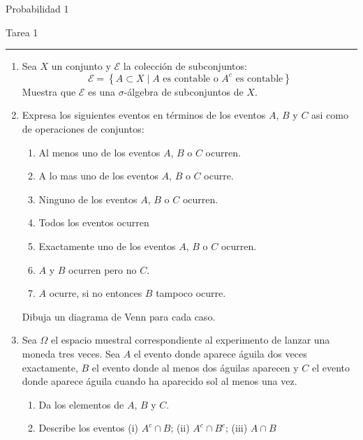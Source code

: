 \documentclass[12pt]{extreport}
\begin{document}
\begin{center}
    \textsf{\Large Probabilidad 1}
    \par\medskip
    \textsf{\large Tarea 1}
\end{center}
\hrule
\par\bigskip

\begin{enumerate}
    \item Sea $X$ un conjunto y $\mathcal{E}$ la colección de subconjuntos:
          $$
              \mathcal{E} = \left\{A\subset X \mid A \text{ es contable o } A^c \text{ es contable}  \right\}
          $$
          Muestra que $\mathcal{E}$ es una $\sigma$-álgebra de subconjuntos de $X$.
    \item Expresa los siguientes eventos en términos de los eventos $A$, $B$ y $C$ asi como de operaciones de conjuntos:
          \begin{enumerate}
              \item Al menos uno de los eventos $A$, $B$ o $C$ ocurren.
              \item A lo mas uno de los eventos $A$, $B$ o $C$ ocurre.
              \item Ninguno de los eventos $A$, $B$ o $C$ ocurren.
              \item Todos los eventos ocurren
              \item Exactamente uno de los eventos $A$, $B$ o $C$ ocurren.
              \item $A$ y $B$ ocurren pero no $C$.
              \item $A$ ocurre, si no entonces $B$ tampoco ocurre.
          \end{enumerate}
          Dibuja un diagrama de Venn para cada caso.
    \item Sea $\Omega$ el espacio muestral correspondiente al experimento de lanzar una moneda tres veces. Sea $A$ el evento donde aparece águila dos veces exactamente, $B$ el evento donde al menos dos águilas aparecen y $C$ el evento donde aparece águila cuando ha aparecido sol al menos una vez.
          \begin{enumerate}
              \item Da los elementos de $A$, $B$ y $C$.
              \item Describe los eventos (i) $A^c\cap B$; (ii) $A^c\cap B^c$; (iii) $A\cap B$
          \end{enumerate}

\end{enumerate}
\end{document}
